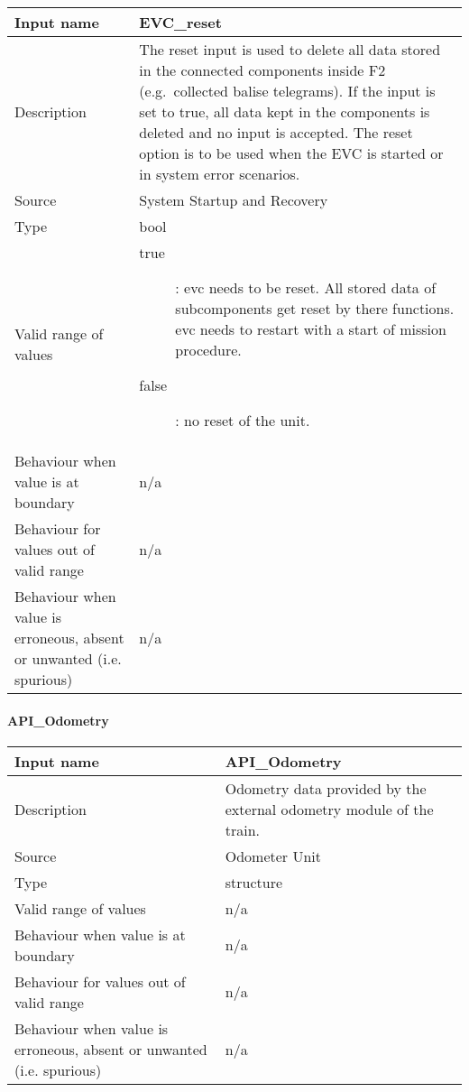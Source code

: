 \begin{longtable}{p{}p{}}
\toprule
Input name				& EVC\_reset \\
\midrule
Description				&  The reset input is used to delete all data stored in the connected components inside F2 (e.g.~collected balise telegrams). If the input is set to true, all data kept in the components is deleted and no input is accepted. The reset option is to be used when the EVC is started or in system error scenarios. \\
\midrule
Source					& System Startup and Recovery\\ 
\midrule
Type					& bool \\
\midrule
Valid range of values	&
\begin{description}
\item [true]: evc needs to be reset. All stored data of subcomponents get reset by there functions. evc needs to restart with a start of mission procedure.
\item [false]: no reset of the unit.
\end{description}
\\
\midrule
Behaviour when value is at boundary	& n/a \\
\midrule
Behaviour for values out of valid range	& n/a \\
\midrule
Behaviour when value is erroneous, absent or unwanted (i.e. spurious) &n/a \\
\bottomrule
\end{longtable}

\paragraph{API\_Odometry}

\begin{longtable}{p{}p{}}
\toprule
Input name				& API\_Odometry \\
\midrule
Description				& Odometry data provided by the external odometry module of the train. \\
\midrule
Source					& Odometer Unit\\ 
\midrule
Type					& structure \\
\midrule
Valid range of values	& n/a \\
\midrule
Behaviour when value is at boundary	& n/a \\
\midrule
Behaviour for values out of valid range	& n/a \\
\midrule
Behaviour when value is erroneous, absent or unwanted (i.e. spurious) & n/a \\
\bottomrule
\end{longtable}

